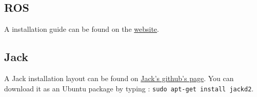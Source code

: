  \subsection{ROS}
 A \ros installation guide can be found on the
  \href{http://wiki.ros.org/indigo/Installation/Ubuntu}{\ros website}.
 \subsection{Jack}
 A Jack installation layout can be found on \href{https://github.com/jackaudio/jackaudio.github.com/wiki/InstallationLayout}{Jack's github's page}. You can download it as an Ubuntu package by typing : \lstinline'sudo apt-get install jackd2'.